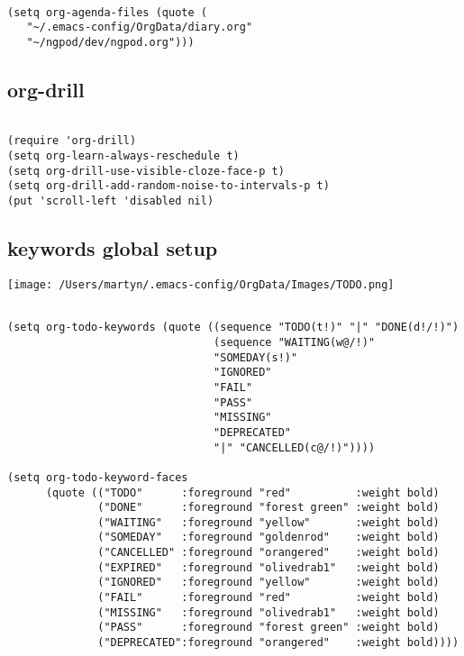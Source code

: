 \documentclass[colorlinks=true,urlcolor=blue,listings-sv]{article}
\begin{document}
\lstset{language=Lisp}
\begin{lstlisting}

(setq org-agenda-files (quote (
   "~/.emacs-config/OrgData/diary.org"
   "~/ngpod/dev/ngpod.org")))
\end{lstlisting}
\subsection{org-drill}
\label{sec-1-28}
\label{eb6dd9b1-86bd-4fb4-acb3-992ef90e29da}



\lstset{language=Lisp}
\begin{lstlisting}

(require 'org-drill)
(setq org-learn-always-reschedule t)
(setq org-drill-use-visible-cloze-face-p t)
(setq org-drill-add-random-noise-to-intervals-p t)
(put 'scroll-left 'disabled nil)
\end{lstlisting}
\subsection{\TODO keywords global setup}
\label{sec-1-29}
\label{c22f6325-70c9-42c3-8c30-221f115c864d}


\texttt{[image: /Users/martyn/.emacs-config/OrgData/Images/TODO.png]}


\lstset{language=Lisp}
\begin{lstlisting}

(setq org-todo-keywords (quote ((sequence "TODO(t!)" "|" "DONE(d!/!)")
                                (sequence "WAITING(w@/!)"
                                "SOMEDAY(s!)" 
                                "IGNORED" 
                                "FAIL" 
                                "PASS"
                                "MISSING"
                                "DEPRECATED"
                                "|" "CANCELLED(c@/!)"))))

(setq org-todo-keyword-faces
      (quote (("TODO"      :foreground "red"          :weight bold)
              ("DONE"      :foreground "forest green" :weight bold)
              ("WAITING"   :foreground "yellow"       :weight bold)
              ("SOMEDAY"   :foreground "goldenrod"    :weight bold)
              ("CANCELLED" :foreground "orangered"    :weight bold)
              ("EXPIRED"   :foreground "olivedrab1"   :weight bold)
              ("IGNORED"   :foreground "yellow"       :weight bold)
              ("FAIL"      :foreground "red"          :weight bold)
              ("MISSING"   :foreground "olivedrab1"   :weight bold)
              ("PASS"      :foreground "forest green" :weight bold)
              ("DEPRECATED":foreground "orangered"    :weight bold))))
\end{lstlisting}
\end{document}
